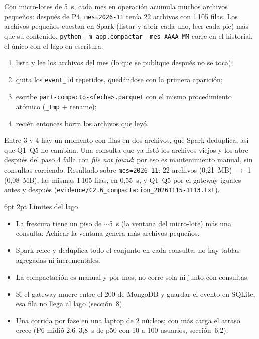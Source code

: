 \documentclass[10pt,letterpaper]{article}
\makeatletter
\newcommand{\ev}[1]{{\footnotesize\texttt{evidence/\allowbreak #1}}}
\renewcommand\subsection{\@startsection{subsection}{2}{\z@}%
  {6pt \@plus 1pt}{2pt}%
  {\normalfont\normalsize\bfseries\color{acc}}}
\makeatother
\begin{document}
Con micro-lotes de 5~s, cada mes en operación acumula muchos archivos pequeños: después de P4,
\texttt{mes=2026-11} tenía 22 archivos con 1\,105 filas. Los archivos pequeños cuestan en Spark (listar y
abrir cada uno, leer cada pie) más que su contenido. \texttt{python -m app.compactar --mes AAAA-MM} corre en
el historial, el único con el lago en escritura:
\begin{enumerate}\setlength{\itemsep}{0pt}
\item lista y lee los archivos del mes (lo que se publique después no se toca);
\item quita los \texttt{event\_id} repetidos, quedándose con la primera aparición;
\item escribe \texttt{part-compacto-<fecha>.parquet} con el mismo procedimiento atómico (\texttt{\_tmp} +
rename);
\item recién entonces borra los archivos que leyó.
\end{enumerate}
Entre 3 y 4 hay un momento con filas en dos archivos, que Spark deduplica, así que Q1--Q5 no cambian. Una
consulta que ya listó los archivos viejos y los abre después del paso 4 falla con \emph{file not found}: por
eso es mantenimiento manual, sin consultas corriendo. Resultado sobre \texttt{mes=2026-11}: 22 archivos
(0,21~MB) $\rightarrow$ 1 (0,08~MB), las mismas 1\,105 filas, en 0,55~s, y Q1--Q5 por el gateway iguales
antes y después (\ev{C2.6\_compactacion\_20261115-1113.txt}).

\subsection{Límites del lago}

\begin{itemize}\setlength{\itemsep}{1pt}
\item La frescura tiene un piso de $\sim$5~s (la ventana del micro-lote) más una consulta. Achicar la ventana
genera más archivos pequeños.
\item Spark relee y deduplica todo el conjunto en cada consulta: no hay tablas agregadas ni incrementales.
\item La compactación es manual y por mes; no corre sola ni junto con consultas.
\item Si el gateway muere entre el 200 de MongoDB y guardar el evento en SQLite, esa fila no llega al lago
(sección~8).
\item Una corrida por fase en una laptop de 2 núcleos; con más carga el atraso crece (P6 midió 2,6--3,8~s
de p50 con 10 a 100 usuarios, sección~6.2).
\end{itemize}
\end{document}
